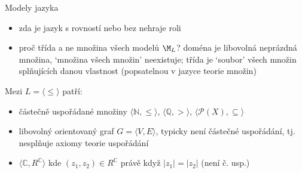 \documentclass{beamer}
\begin{document}
\begin{frame}{Modely jazyka}

    \medskip

    \pause

    \pause
    \begin{itemize}
        \item zda je jazyk s rovností nebo bez nehraje roli\pause
        \item proč \alert{třída} a ne \alert{množina} všech modelů $\M_L$? doména je libovolná neprázdná množina, `množina všech množin' neexistuje; třída je \alert{`soubor'} všech množin splňujících danou vlastnost (popsatelnou v \alert{jazyce teorie množin})\pause
    \end{itemize}
    
    Mezi  $L=\langle \leq \rangle$ patří:\pause
    \begin{itemize}
        \item částečně uspořádané množiny $\langle \mathbb N,\leq\rangle$, $\langle \mathbb Q, > \rangle$, $\langle\mathcal P(X),\subseteq\rangle$\pause
        \item libovolný orientovaný graf $G=\langle V,E\rangle$, typicky není částečné uspořádání, tj. nesplňuje axiomy \alert{teorie uspořádání}\pause
        \item $\langle \mathbb C,R^\mathbb C\rangle$ kde $(z_1,z_2)\in R^\mathbb C$ právě když $|z_1|=|z_2|$ (není č. usp.)
    \end{itemize}

\end{frame}
\end{document}
